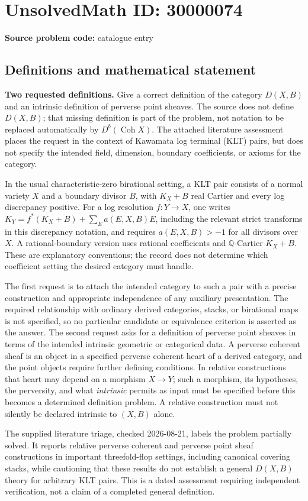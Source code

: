 \documentclass[11pt]{article}
\newcommand{\Q}{\mathbb{Q}}
\begin{document}
\section*{UnsolvedMath ID: 30000074}
\textbf{Source problem code:} catalogue entry
\subsection{Definitions and mathematical statement}
\textbf{Two requested definitions.} Give a correct definition of the category \(D(X,B)\) and an intrinsic definition of perverse point sheaves. The source does not define \(D(X,B)\); that missing definition is part of the problem, not notation to be replaced automatically by \(D^b(\operatorname{Coh}X)\). The attached literature assessment places the request in the context of Kawamata log terminal (KLT) pairs, but does not specify the intended field, dimension, boundary coefficients, or axioms for the category.\par In the usual characteristic-zero birational setting, a KLT pair consists of a normal variety \(X\) and a boundary divisor \(B\), with \(K_X+B\) real Cartier and every log discrepancy positive. For a log resolution \(f:Y\to X\), one writes \(K_Y=f^*(K_X+B)+\sum_E a(E,X,B)E\), including the relevant strict transforms in this discrepancy notation, and requires \(a(E,X,B)>-1\) for all divisors over \(X\). A rational-boundary version uses rational coefficients and \(\Q\)-Cartier \(K_X+B\). These are explanatory conventions; the record does not determine which coefficient setting the desired category must handle.\par The first request is to attach the intended category to such a pair with a precise construction and appropriate independence of any auxiliary presentation. The required relationship with ordinary derived categories, stacks, or birational maps is not specified, so no particular candidate or equivalence criterion is asserted as the answer. The second request asks for a definition of perverse point sheaves in terms of the intended intrinsic geometric or categorical data. A perverse coherent sheaf is an object in a specified perverse coherent heart of a derived category, and the point objects require further defining conditions. In relative constructions that heart may depend on a morphism \(X\to Y\); such a morphism, its hypotheses, the perversity, and what \emph{intrinsic} permits as input must be specified before this becomes a determined definition problem. A relative construction must not silently be declared intrinsic to \((X,B)\) alone.\par The supplied literature triage, checked 2026-08-21, labels the problem partially solved. It reports relative perverse coherent and perverse point sheaf constructions in important threefold-flop settings, including canonical covering stacks, while cautioning that these results do not establish a general \(D(X,B)\) theory for arbitrary KLT pairs. This is a dated assessment requiring independent verification, not a claim of a completed general definition.
\end{document}
